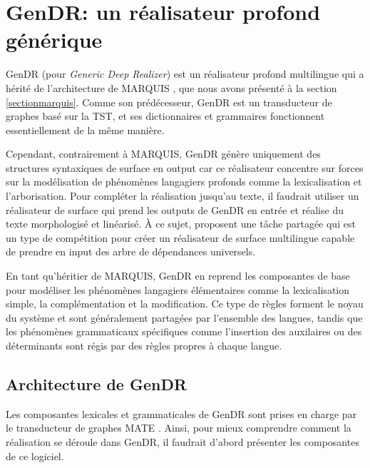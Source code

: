 
\chapter{GenDR: un réalisateur profond générique}\label{chapgendr}

GenDR (pour \emph{Generic Deep Realizer}) est un réalisateur profond multilingue \citep{lareau18} qui a hérité de l'architecture de MARQUIS \citep{WannerMARQUISGENERATIONUSERTAILORED2010}, que nous avons présenté à la section \ref{sectionmarquis}. Comme son prédécesseur, GenDR est un transducteur de graphes basé sur la \ac{TST}, et ses dictionnaires et grammaires fonctionnent essentiellement de la même manière.

Cependant, contrairement à MARQUIS, GenDR génère uniquement des structures syntaxiques de surface en output car ce réalisateur concentre sur forces sur la modélisation de phénomènes langagiers profonds comme la lexicalisation et l'arborisation. Pour compléter la réalisation jusqu'au texte, il faudrait utiliser un réalisateur de surface qui prend les outputs de GenDR en entrée et réalise du texte morphologisé et linéarisé. À ce sujet, \cite{MilleSharedTaskProposal2017a} proposent une tâche partagée qui est un type de compétition pour créer un réalisateur de surface multilingue capable de prendre en input des arbre de dépendances universels.

En tant qu'héritier de MARQUIS, GenDR en reprend les composantes de base pour modéliser les phénomènes langagiers élémentaires comme la lexicalisation simple, la complémentation et la modification. Ce type de règles forment le noyau du système et sont généralement partagées par l'ensemble des langues, tandis que les phénomènes grammaticaux spécifiques comme l'insertion des auxilaires ou des déterminants sont régis par des règles propres à chaque langue.

\section{Architecture de GenDR}

Les composantes lexicales et grammaticales de GenDR sont prises en charge par le transducteur de graphes MATE \citep{BohnetDevelopmentEnvironmentMTTbased2000a,BOHNET10}. Ainsi, pour mieux comprendre comment la réalisation se déroule dans GenDR, il faudrait d'abord présenter les composantes de ce logiciel.

